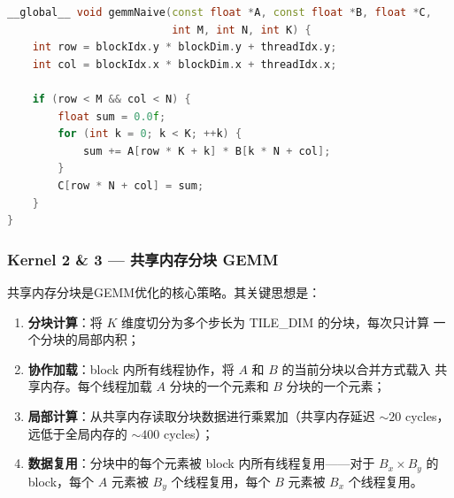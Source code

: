 \documentclass[UTF8,a4paper,12pt,fontset=none]{ctexart}
\begin{document}
\begin{lstlisting}[language=C++, caption={朴素全局内存 GEMM Kernel}]
__global__ void gemmNaive(const float *A, const float *B, float *C,
                          int M, int N, int K) {
    int row = blockIdx.y * blockDim.y + threadIdx.y;
    int col = blockIdx.x * blockDim.x + threadIdx.x;

    if (row < M && col < N) {
        float sum = 0.0f;
        for (int k = 0; k < K; ++k) {
            sum += A[row * K + k] * B[k * N + col];
        }
        C[row * N + col] = sum;
    }
}
\end{lstlisting}

\subsubsection{Kernel 2 \& 3 — 共享内存分块 GEMM}

共享内存分块是GEMM优化的核心策略。其关键思想是：

\begin{enumerate}[leftmargin=2.2em]
  \item \textbf{分块计算}：将 $K$ 维度切分为多个步长为 TILE\_DIM 的分块，每次只计算
        一个分块的局部内积；
  \item \textbf{协作加载}：block 内所有线程协作，将 $A$ 和 $B$ 的当前分块以合并方式载入
        共享内存。每个线程加载 $A$ 分块的一个元素和 $B$ 分块的一个元素；
  \item \textbf{局部计算}：从共享内存读取分块数据进行乘累加（共享内存延迟 $\sim 20$ cycles，
        远低于全局内存的 $\sim 400$ cycles）；
  \item \textbf{数据复用}：分块中的每个元素被 block 内所有线程复用——对于 $B_x \times B_y$
        的 block，每个 $A$ 元素被 $B_y$ 个线程复用，每个 $B$ 元素被 $B_x$ 个线程复用。
\end{enumerate}
\end{document}
